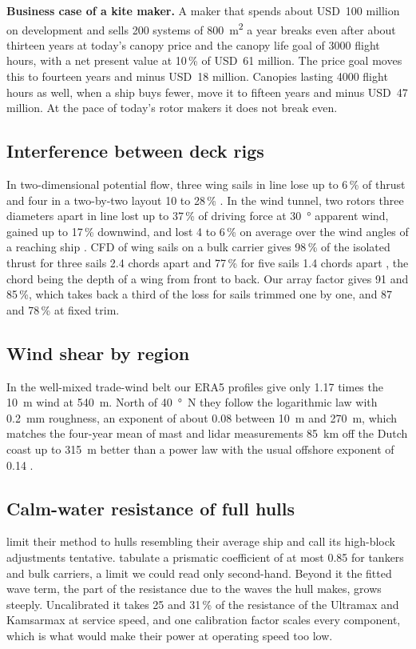 \textbf{Business case of a kite maker.} A maker that spends about USD~100 million on development and sells 200 systems of \SI{800}{m^2} a year breaks even after about thirteen years at today's canopy price and the canopy life goal of \num{3000} flight hours, with a net present value at 10\,\% of USD~61 million. The price goal moves this to fourteen years and minus USD~18 million. Canopies lasting \num{4000} flight hours as well, when a ship buys fewer, move it to fifteen years and minus USD~47 million. At the pace of today's rotor makers it does not break even.

\subsection{Interference between deck rigs}
\label{sec:disc_details_size}

In two-dimensional potential flow, three wing sails in line lose up to 6\,\% of thrust and four in a two-by-two layout 10 to 28\,\% \citep{vanreen2026}. In the wind tunnel, two rotors three diameters apart in line lost up to 37\,\% of driving force at \SI{30}{\degree} apparent wind, gained up to 17\,\% downwind, and lost 4 to 6\,\% on average over the wind angles of a reaching ship \citep{bordogna2020}. CFD of wing sails on a bulk carrier gives 98\,\% of the isolated thrust for three sails 2.4 chords apart and 77\,\% for five sails 1.4 chords apart \citep{mboumba2022}, the chord being the depth of a wing from front to back. Our array factor gives 91 and 85\,\%, which takes back a third of the loss for sails trimmed one by one, and 87 and 78\,\% at fixed trim.

\subsection{Wind shear by region}
\label{sec:disc_details_profile}

In the well-mixed trade-wind belt our ERA5 profiles give only 1.17 times the \SI{10}{m} wind at \SI{540}{m}. North of \SI{40}{\degree N} they follow the logarithmic law with \SI{0.2}{mm} roughness, an exponent of about 0.08 between \SI{10}{m} and \SI{270}{m}, which matches the four-year mean of mast and lidar measurements \SI{85}{km} off the Dutch coast up to \SI{315}{m} better than a power law with the usual offshore exponent of 0.14 \citep{kalverla2020thesis}.

\subsection{Calm-water resistance of full hulls}
\label{sec:disc_details_hull}

\citet{holtrop1982} limit their method to hulls resembling their average ship and call its high-block adjustments tentative. \citet{ortigosa2009} tabulate a prismatic coefficient of at most 0.85 for tankers and bulk carriers, a limit we could read only second-hand. Beyond it the fitted wave term, the part of the resistance due to the waves the hull makes, grows steeply. Uncalibrated it takes 25 and 31\,\% of the resistance of the Ultramax and Kamsarmax at service speed, and one calibration factor scales every component, which is what would make their power at operating speed too low.

